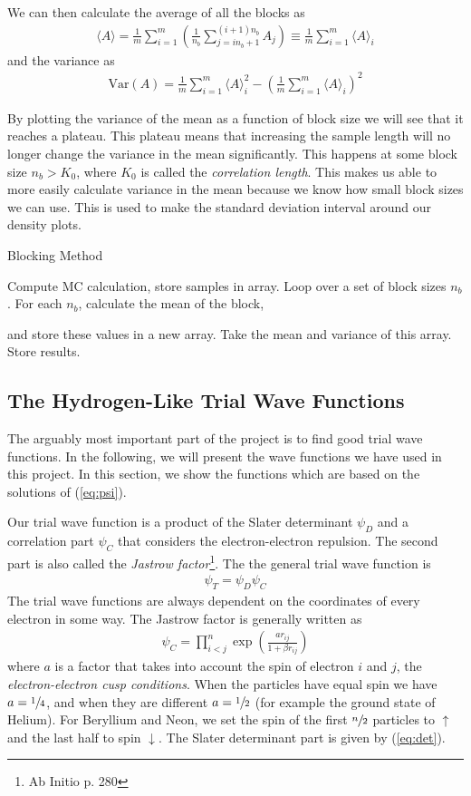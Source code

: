 \documentclass[twocolumns, a4paper,11pt,fleqn]{extarticle}
\newcommand{\eq}[1]{{\small\begin{align*}#1\end{align*}}}
\newcommand{\equ}[1]{{\small\begin{align}#1\end{align}}}
\newcommand{\Var}[1]{\mathrm{Var}(#1)}
\begin{document}
We can then calculate the average of all the blocks as
\eq{
  \langle A \rangle = 
  \frac{1}{m}\sum_{i=1}^m \left(
    \frac{1}{n_b}\sum_{j=in_b+1}^{(i+1)n_b} A_j \right)
  \equiv \frac{1}{m}\sum_{i=1}^m \langle A \rangle_i
}
and the variance as
\eq{
  \Var{A}=
  \frac{1}{m}\sum_{i=1}^m \langle A \rangle_i^2
  -\left(\frac{1}{m}\sum_{i=1}^m \langle A \rangle_i\right)^2
}

By plotting the variance of the mean as a function of block size we 
will see that it reaches a plateau.
This plateau means that increasing the sample length will no longer
change the variance in the mean significantly. 
This happens at some block size $n_b > K_0$, 
where $K_0$ is called the \textit{correlation length}. 
This makes us able to more easily calculate variance in the mean because we know how small block sizes we can use. 
This is used to make the standard deviation interval around our density plots. 

\begin{algorithm}[H]
	\caption{Blocking Method}\label{algo:block}
  \begin{algorithmic}[1]
      \State Compute MC calculation, store samples in array.
      \State Loop over a set of block sizes $n_b$.
      \State For each $n_b$, calculate the mean of the block,
      
        and store these values in a new array.
      \State Take the mean and variance of this array.
      \State Store results.
    \EndProcedure
  \end{algorithmic}
\end{algorithm}

\subsection{The Hydrogen-Like Trial Wave Functions}
The arguably most important part of the project is to find good
trial wave functions. In the following, we will present
the wave functions we have used in this project.
In this section, we show the functions which are based on
the solutions of (\ref{eq:psi}).

Our trial wave function is a product of the Slater determinant $\psi_D$ and
a correlation part $\psi_C$ that considers the electron-electron repulsion.
The second part is also called the \textit{Jastrow factor}\footnote{Ab Initio p. 280}.
The the general trial wave function is
\eq{
  \psi_T = \psi_D \psi_C
}
The trial wave functions are always dependent on the coordinates of every
electron in some way.
The Jastrow factor is generally written as
\equ{
  \psi_C = \prod_{i<j}^{n}\exp{\left(\frac{a r_{ij}}{1+\beta r_{ij}}\right)}
  \label{eq:psicor}
}
where $a$ is a factor that takes into account the spin of electron $i$ and $j$,
the \textit{electron-electron cusp conditions}.
When the particles have equal spin we have $a=\sfrac{1}{4}$,
and when they are different $a=\sfrac{1}{2}$ (for example the ground state of Helium).
For Beryllium and Neon, we set the spin of the first $\sfrac{n}{2}$ particles to
$\uparrow$ and the last half to spin $\downarrow$.
The Slater determinant part is given by (\ref{eq:det}).
\end{document}
